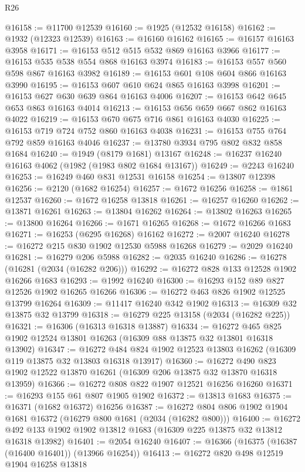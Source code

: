 \begin{lexlean}{R26}
\begin{coremodule}
@16158 := @11700 @12539
@16160 := @1925 (@12532 @16158)
@16162 := @1932 (@12323 @12539)
@16163 := @16160 @16162
@16165 := @16157 @16163 @3958
@16171 := @16153 @512 @515 @532 @869 @16163 @3966
@16177 := @16153 @535 @538 @554 @868 @16163 @3974
@16183 := @16153 @557 @560 @598 @867 @16163 @3982
@16189 := @16153 @601 @108 @604 @866 @16163 @3990
@16195 := @16153 @607 @610 @624 @865 @16163 @3998
@16201 := @16153 @627 @630 @639 @864 @16163 @4006
@16207 := @16153 @642 @645 @653 @863 @16163 @4014
@16213 := @16153 @656 @659 @667 @862 @16163 @4022
@16219 := @16153 @670 @675 @716 @861 @16163 @4030
@16225 := @16153 @719 @724 @752 @860 @16163 @4038
@16231 := @16153 @755 @764 @792 @859 @16163 @4046
@16237 := @13780 @3934 @795 @802 @832 @858 @1684
@16240 := @1949 (@8179 @1681) @13167
@16248 := @16237 @16240 @16163 @4062 (@1982 (@1983 @802 @1684 @13167))
@16249 := @2243 @16240
@16253 := @16249 @460 @831 @12531 @16158
@16254 := @13807 @12398
@16256 := @2120 (@1682 @16254)
@16257 := @1672 @16256
@16258 := @1861 @12537
@16260 := @1672 @16258 @13818
@16261 := @16257 @16260
@16262 := @13871 @16261
@16263 := @13804 @16262
@16264 := @13802 @16263
@16265 := @13800 @16264
@16266 := @1671 @16265
@16268 := @1672 @16266 @1683
@16271 := @16253 (@6295 @16268) @16162
@16272 := @2007 @16240
@16278 := @16272 @215 @830 @1902 @12530 @5988 @16268
@16279 := @2029 @16240
@16281 := @16279 @206 @5988
@16282 := @2035 @16240
@16286 := @16278 (@16281 (@2034 (@16282 @206)))
@16292 := @16272 @828 @133 @12528 @1902 @16266 @1683
@16293 := @1992 @16240
@16300 := @16293 @152 @89 @827 @12526 @1902 @16265 @16266
@16306 := @16272 @463 @826 @1902 @12525 @13799 @16264
@16309 := @11417 @16240 @342 @1902
@16313 := @16309 @32 @13875 @32 @13799
@16318 := @16279 @225 @13158 (@2034 (@16282 @225))
@16321 := @16306 (@16313 @16318 @13887)
@16334 := @16272 @465 @825 @1902 @12524 @13801 @16263 (@16309 @88 @13875 @32 @13801 @16318 @13902)
@16347 := @16272 @484 @824 @1902 @12523 @13803 @16262 (@16309 @119 @13875 @32 @13803 @16318 @13917)
@16360 := @16272 @490 @823 @1902 @12522 @13870 @16261 (@16309 @206 @13875 @32 @13870 @16318 @13959)
@16366 := @16272 @808 @822 @1907 @12521 @16256 @16260
@16371 := @16293 @155 @61 @807 @1905 @1902
@16372 := @13813 @1683
@16375 := @16371 (@1682 @16372) @16256
@16387 := @16272 @804 @806 @1902 @1904 @1681 @16372 (@16279 @800 @1681 (@2034 (@16282 @800)))
@16400 := @16272 @492 @133 @1902 @1902 @13812 @1683 (@16309 @225 @13875 @32 @13812 @16318 @13982)
@16401 := @2054 @16240
@16407 := @16366 (@16375 (@16387 (@16400 @16401)) (@13966 @16254))
@16413 := @16272 @820 @498 @12519 @1904 @16258 @13818

\end{coremodule}
\end{lexlean}
